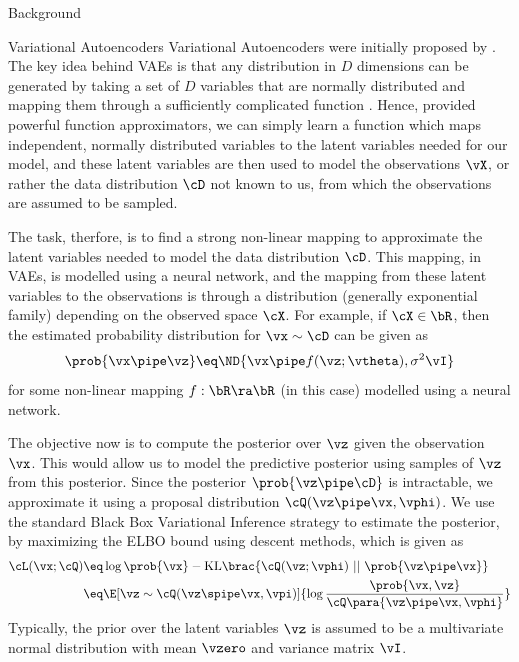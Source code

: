 \documentclass{article}
\begin{document}
\begin{psection}{Background}
	\begin{psubsection}{Variational Autoencoders}
		Variational Autoencoders were initially proposed by \cite{vae}. The key idea behind VAEs is that any distribution in $D$ dimensions can be generated by taking a set of $D$ variables that are normally distributed and mapping them through a sufficiently complicated function \citep{vae-tut}. Hence, provided powerful function approximators, we can simply learn a function which maps independent, normally distributed variables to the latent variables needed for our model, and these latent variables are then used to model the observations $\vX$, or rather the data distribution $\cD$ not known to us, from which the observations are assumed to be sampled.

		The task, therfore, is to find a strong non-linear mapping to approximate the latent variables needed to model the data distribution $\cD$. This mapping, in VAEs, is modelled using a neural network, and the mapping from these latent variables to the observations is through a distribution (generally exponential family) depending on the observed space $\cX$. For example, if $\cX \in \bR$, then the estimated probability distribution for $\vx \sim \cD$ can be given as
		\begin{align*}
			\prob{\vx \pipe \vz} \eq \ND{\vx \pipe f(\vz; \vtheta), \sigma^2 \vI}
		\end{align*}
		for some non-linear mapping $f: \bR \ra \bR$ (in this case) modelled using a neural network.

		The objective now is to compute the posterior over $\vz$ given the observation $\vx$. This would allow us to model the predictive posterior using samples of $\vz$ from this posterior. Since the posterior $\prob{\vz \pipe \cD}$ is intractable, we approximate it using a proposal distribution $\cQ(\vz \pipe \vx, \vphi)$. We use the standard Black Box Variational Inference strategy to estimate the posterior, by maximizing the ELBO bound using descent methods, which is given as
		\begin{align*}
			\cL(\vx; \cQ) &\eq \log{\prob{\vx}} - \text{KL}\brac{\cQ(\vz; \vphi)\ ||\ \prob{\vz \pipe \vx}} \\
			&\eq \E[\vz \sim \cQ(\vz \spipe \vx, \vpi)]{\log{\frac{\prob{\vx, \vz}}{\cQ\para{\vz \pipe \vx, \vphi}}}}
		\end{align*}
		Typically, the prior over the latent variables $\vz$ is assumed to be a multivariate normal distribution with mean $\vzero$ and variance matrix $\vI$.


\end{psubsection}
\end{psection}
\end{document}

